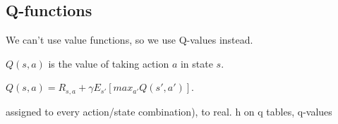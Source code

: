 
\subsection{Q-functions}

We can't use value functions, so we use Q-values instead.

\(Q(s,a)\) is the value of taking action \(a\) in state \(s\).

\(Q(s,a)=R_{s,a}+\gamma E_{s'}[max_{a'}Q(s',a')]\).


assigned to every action/state combination), to real. h on q tables, q-values

